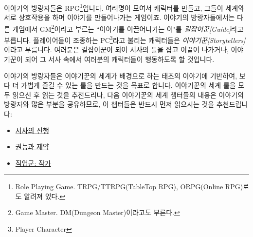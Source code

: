 \documentclass{report}
\begin{document}
	이야기의 방랑자들은 RPG\footnote{Role Playing Game. TRPG/TTRPG(TableTop RPG), ORPG(Online RPG)로도 알려져 있다.}입니다. 여러명이 모여서 캐릭터를 만들고, 그들이 세계와 서로 상호작용을 하며 이야기를 만들어나가는 게임이죠. 이야기의 방랑자들에서는 다른 게임에서 GM\footnote{Game Master. DM(Dungeon Master)이라고도 부른다.}이라고 부르는 ``이야기를 이끌어나가는 이"를 \emph{길잡이꾼[Guide]}라고 부릅니다. 플레이어들이 조종하는 PC\footnote{Player Character}라고 불리는 캐릭터들은 \emph{이야기꾼[Storytellers]}이라고 부릅니다. 여러분은 길잡이꾼이 되어 서사의 틀을 잡고 이끌어 나가거나, 이야기꾼이 되어 그 서사 속에서 여러분의 캐릭터들이 행동하도록 할 것입니다.
	
	이야기의 방랑자들은 이야기꾼의 세계가 배경으로 하는 태초의 이야기에 기반하여, 보다 더 가볍게 즐길 수 있는 룰을 만드는 것을 목표로 합니다. 이야기꾼의 세계 룰을 모두 읽으신 후 읽는 것을 추천드리나, 다음 이야기꾼의 세계 챕터들의 내용은 이야기의 방랑자와 많은 부분을 공유하므로, 이 챕터들은 반드시 먼저 읽으시는 것을 추천드립니다:
	\begin{itemize}
		\item \hyperlink{story-progression}{서사의 진행}
		\item \hyperlink{power-limit}{권능과 제약}
		\item \hyperlink{author}{직업군: 작가}
	\end{itemize}
\end{document}
